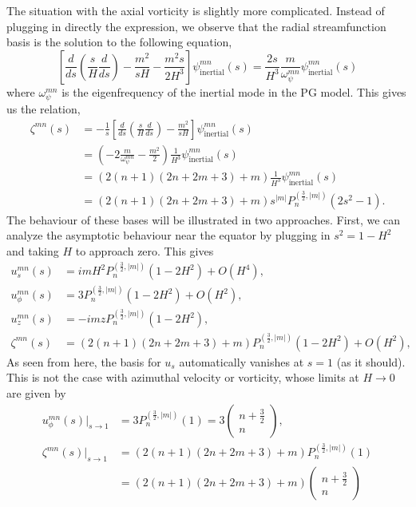 The situation with the axial vorticity is slightly more complicated. Instead of plugging in directly the expression, we observe that the radial streamfunction basis is the solution to the following equation,
\[
    \left[\frac{d}{ds} \left(\frac{s}{H} \frac{d}{ds}\right) - \frac{m^2}{sH} - \frac{m^2 s}{2H^3}\right] \psi_\mathrm{inertial}^{mn}(s) = \frac{2s}{H^3} \frac{m}{\omega_\psi^{mn}} \psi_\mathrm{inertial}^{mn}(s)
\]
where $\omega_\psi^{mn}$ is the eigenfrequency of the inertial mode in the PG model. This gives us the relation,
\begin{equation}
\begin{aligned}
    \zeta^{mn}(s) &= -\frac{1}{s} \left[\frac{d}{ds} \left(\frac{s}{H} \frac{d}{ds}\right) - \frac{m^2}{sH}\right] \psi_\mathrm{inertial}^{mn}(s) \\
    &= \left(-2\frac{m}{\omega_\psi^{mn}} - \frac{m^2}{2}\right) \frac{1}{H^3} \psi_\mathrm{inertial}^{mn}(s) \\ 
    &= \left(2(n+1)(2n+2m+3) + m\right) \frac{1}{H^3} \psi_\mathrm{inertial}^{mn}(s) \\ 
    &= \left(2(n+1)(2n+2m+3) + m\right) s^{|m|} P_n^{(\frac{3}{2}, |m|)}(2s^2 - 1).
\end{aligned}
\end{equation}
The behaviour of these bases will be illustrated in two approaches. First, we can analyze the asymptotic behaviour near the equator by plugging in $s^2 = 1-H^2$ and taking $H$ to approach zero. This gives
\[
\begin{aligned}
    u_s^{mn}(s) &= im H^2 P_n^{(\frac{3}{2},|m|)} (1-2H^2) + O(H^4),\\ 
    u_\phi^{mn}(s) &= 3 P_n^{(\frac{3}{2},|m|)} (1-2H^2) + O(H^2),\\
    u_z^{mn}(s) &= -imz P_n^{(\frac{3}{2},|m|)} (1-2H^2),\\
    \zeta^{mn}(s) &= \left(2(n+1)(2n+2m+3) + m\right) P_n^{(\frac{3}{2},|m|)} (1-2H^2) + O(H^2),
\end{aligned}
\]
As seen from here, the basis for $u_s$ automatically vanishes at $s=1$ (as it should). This is not the case with azimuthal velocity or vorticity, whose limits at $H\rightarrow 0$ are given by
\[\begin{aligned}
    u_\phi^{mn}(s)|_{s\rightarrow 1} &= 3 P_n^{(\frac{3}{2}, |m|)}(1) = 3 \begin{pmatrix} n + \frac{3}{2} \\ n \end{pmatrix},\\
    \zeta^{mn}(s)|_{s\rightarrow 1} &= \left(2(n+1)(2n+2m+3) + m\right) P_n^{(\frac{3}{2}, |m|)}(1) \\ 
    &= \left(2(n+1)(2n+2m+3) + m\right) \begin{pmatrix} n + \frac{3}{2} \\ n \end{pmatrix}
\end{aligned}\]
